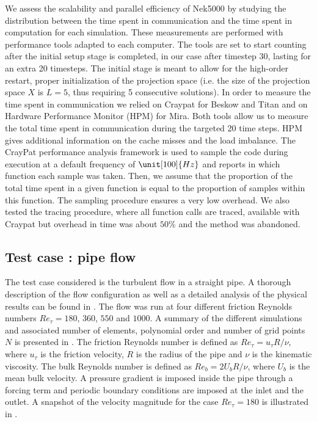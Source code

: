 \documentclass{sig-alternate}
\begin{document}
We assess the scalability and parallel efficiency of Nek5000 by studying the distribution
between the time spent in communication and the time spent in computation for each 
simulation. These measurements are performed with performance tools adapted to each 
computer. The tools are set to start counting after the initial setup stage is 
completed, in our case after timestep 30, lasting for an extra 20 timesteps.  
The initial stage is meant to allow for the high-order restart, proper initialization 
of the projection space (i.e.  the size of the projection space $X$ is $L= 5$, thus
requiring 5 consecutive solutions). In order to measure the time spent in communication 
we relied on Craypat for
Beskow and Titan and on Hardware Performance Monitor (HPM) for Mira. Both tools
allow us to measure the total time spent in communication during the targeted 20 time
steps. HPM gives additional information on the cache misses and the load
imbalance. The CrayPat performance analysis framework is used to sample the code 
during execution at a default frequency of $\unit[100]{Hz}$ and reports in which 
function each sample was taken. Then, we assume that the proportion of the total 
time spent in a given function is equal to the proportion of samples within this 
function. The sampling procedure ensures a very low overhead. We also tested the 
tracing procedure, where all function calls are traced, available with Craypat 
but overhead in time was about $50\%$ and the method was abandoned.

\subsection{Test case : pipe flow}
\label{sec:pipe}

The test case considered is the turbulent flow in a straight pipe. A thorough 
description of the flow configuration as well as a detailed analysis of the physical 
results can be found in \cite{Khoury2013}. The flow was run at four different 
friction Reynolds numbers $Re_{\tau} = 180$, $360$, $550$ and $1000$. A summary 
of the different simulations and associated number of 
elements, polynomial order and number of grid points $N$ is presented in . 
The friction Reynolds number is defined as $Re_{\tau} = u_{\tau} R / \nu$, where $u_{\tau}$ is 
the friction velocity, $R$ is the radius of the pipe and $\nu$ is the kinematic viscosity. The 
bulk Reynolds number is defined as $Re_{b} = 2 U_b R / \nu$, where $U_b$ is the mean bulk
velocity. A pressure gradient is imposed inside the pipe through a forcing term and periodic 
boundary conditions are imposed at the inlet and the outlet. A snapshot of 
the velocity magnitude for the case $Re_{\tau} = 180$ is illustrated in .
\end{document}
